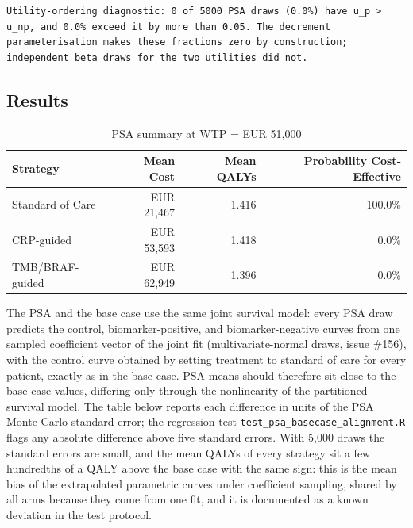 \documentclass[
  11pt,
  a4paper]{article}
\begin{document}
\begin{verbatim}
Utility-ordering diagnostic: 0 of 5000 PSA draws (0.0%) have u_p > u_np, and 0.0% exceed it by more than 0.05. The decrement parameterisation makes these fractions zero by construction; independent beta draws for the two utilities did not.
\end{verbatim}

\subsection{Results}\label{results}

\begin{table}[H]

\caption{PSA summary at WTP = EUR 51,000}
\centering
\begin{tabular}[t]{lrrr}
\toprule
Strategy & Mean Cost & Mean QALYs & Probability Cost-Effective\\
\midrule
Standard of Care & EUR 21,467 & 1.416 & 100.0\%\\
CRP-guided & EUR 53,593 & 1.418 & 0.0\%\\
TMB/BRAF-guided & EUR 62,949 & 1.396 & 0.0\%\\
\bottomrule
\end{tabular}
\end{table}

The PSA and the base case use the same joint survival model: every PSA
draw predicts the control, biomarker-positive, and biomarker-negative
curves from one sampled coefficient vector of the joint fit
(multivariate-normal draws, issue \#156), with the control curve
obtained by setting treatment to standard of care for every patient,
exactly as in the base case. PSA means should therefore sit close to the
base-case values, differing only through the nonlinearity of the
partitioned survival model. The table below reports each difference in
units of the PSA Monte Carlo standard error; the regression test
\texttt{test\_psa\_basecase\_alignment.R} flags any absolute difference
above five standard errors. With 5,000 draws the standard errors are
small, and the mean QALYs of every strategy sit a few hundredths of a
QALY above the base case with the same sign: this is the mean bias of
the extrapolated parametric curves under coefficient sampling, shared by
all arms because they come from one fit, and it is documented as a known
deviation in the test protocol.
\end{document}
